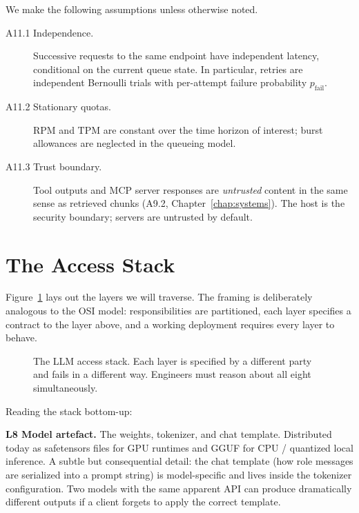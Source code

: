 \begin{notationbox}
We make the following assumptions unless otherwise noted.
\begin{description}
  \item[A11.1 Independence.] Successive requests to the same
    endpoint have independent latency, conditional on the current
    queue state. In particular, retries are independent Bernoulli
    trials with per-attempt failure probability $p_\mathrm{fail}$.
  \item[A11.2 Stationary quotas.] $\mathrm{RPM}$ and $\mathrm{TPM}$
    are constant over the time horizon of interest; burst
    allowances are neglected in the queueing model.
  \item[A11.3 Trust boundary.] Tool outputs and MCP server
    responses are \emph{untrusted} content in the same sense as
    retrieved chunks (A9.2, Chapter~\ref{chap:systems}). The host is the security
    boundary; servers are untrusted by default.
\end{description}
\end{notationbox}

\section{The Access Stack}

Figure~\ref{fig:access_stack} lays out the layers we will traverse.
The framing is deliberately analogous to the OSI model:
responsibilities are partitioned, each layer specifies a contract
to the layer above, and a working deployment requires every layer
to behave.

\begin{figure}[H]
  \centering
  
  \caption{The LLM access stack. Each layer is specified by a
           different party and fails in a different way.
           Engineers must reason about all eight simultaneously.}
  \label{fig:access_stack}
\end{figure}

Reading the stack bottom-up:

\textbf{L8 Model artefact.} The weights, tokenizer, and chat
template. Distributed today as safetensors \citep{safetensors_docs}
files for GPU runtimes and GGUF for CPU / quantized local
inference. A subtle but consequential detail: the chat template
(how role messages are serialized into a prompt string) is
model-specific and lives inside the tokenizer configuration. Two
models with the same apparent API can produce dramatically
different outputs if a client forgets to apply the correct
template.

